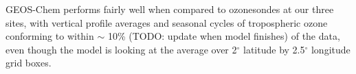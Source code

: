 \documentclass{article}
\begin{document}
  GEOS-Chem performs fairly well when compared to ozonesondes at our three sites, with vertical profile averages and seasonal cycles of tropospheric ozone conforming to within $\sim$ 10\% (TODO: update when model finishes) of the data, even though the model is looking at the average over 2$^{\circ}$ latitude by 2.5$^{\circ}$ longitude grid boxes.
  

\end{document}
